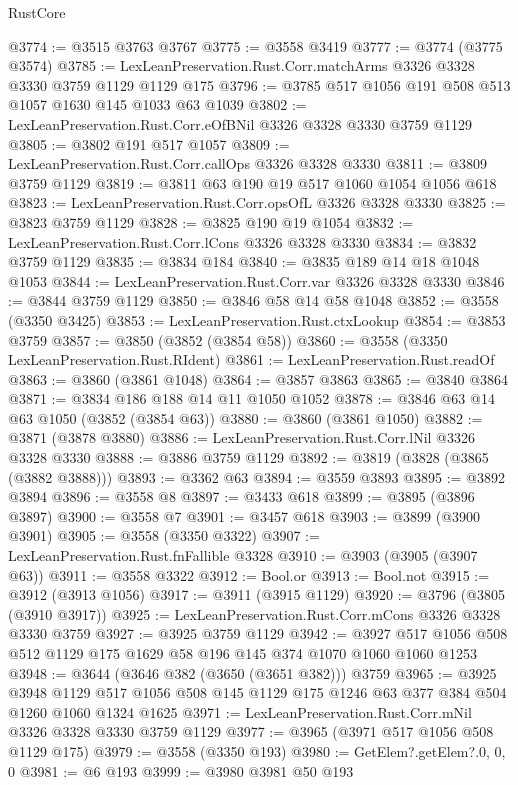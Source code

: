 \begin{lexlean}{RustCore}
\begin{coremodule}
@3774 := @3515 @3763 @3767
@3775 := @3558 @3419
@3777 := @3774 (@3775 @3574)
@3785 := LexLeanPreservation.Rust.Corr.matchArms @3326 @3328 @3330 @3759 @1129 @1129 @175
@3796 := @3785 @517 @1056 @191 @508 @513 @1057 @1630 @145 @1033 @63 @1039
@3802 := LexLeanPreservation.Rust.Corr.eOfBNil @3326 @3328 @3330 @3759 @1129
@3805 := @3802 @191 @517 @1057
@3809 := LexLeanPreservation.Rust.Corr.callOps @3326 @3328 @3330
@3811 := @3809 @3759 @1129
@3819 := @3811 @63 @190 @19 @517 @1060 @1054 @1056 @618
@3823 := LexLeanPreservation.Rust.Corr.opsOfL @3326 @3328 @3330
@3825 := @3823 @3759 @1129
@3828 := @3825 @190 @19 @1054
@3832 := LexLeanPreservation.Rust.Corr.lCons @3326 @3328 @3330
@3834 := @3832 @3759 @1129
@3835 := @3834 @184
@3840 := @3835 @189 @14 @18 @1048 @1053
@3844 := LexLeanPreservation.Rust.Corr.var @3326 @3328 @3330
@3846 := @3844 @3759 @1129
@3850 := @3846 @58 @14 @58 @1048
@3852 := @3558 (@3350 @3425)
@3853 := LexLeanPreservation.Rust.ctxLookup
@3854 := @3853 @3759
@3857 := @3850 (@3852 (@3854 @58))
@3860 := @3558 (@3350 LexLeanPreservation.Rust.RIdent)
@3861 := LexLeanPreservation.Rust.readOf
@3863 := @3860 (@3861 @1048)
@3864 := @3857 @3863
@3865 := @3840 @3864
@3871 := @3834 @186 @188 @14 @11 @1050 @1052
@3878 := @3846 @63 @14 @63 @1050 (@3852 (@3854 @63))
@3880 := @3860 (@3861 @1050)
@3882 := @3871 (@3878 @3880)
@3886 := LexLeanPreservation.Rust.Corr.lNil @3326 @3328 @3330
@3888 := @3886 @3759 @1129
@3892 := @3819 (@3828 (@3865 (@3882 @3888)))
@3893 := @3362 @63
@3894 := @3559 @3893
@3895 := @3892 @3894
@3896 := @3558 @8
@3897 := @3433 @618
@3899 := @3895 (@3896 @3897)
@3900 := @3558 @7
@3901 := @3457 @618
@3903 := @3899 (@3900 @3901)
@3905 := @3558 (@3350 @3322)
@3907 := LexLeanPreservation.Rust.fnFallible @3328
@3910 := @3903 (@3905 (@3907 @63))
@3911 := @3558 @3322
@3912 := Bool.or
@3913 := Bool.not
@3915 := @3912 (@3913 @1056)
@3917 := @3911 (@3915 @1129)
@3920 := @3796 (@3805 (@3910 @3917))
@3925 := LexLeanPreservation.Rust.Corr.mCons @3326 @3328 @3330 @3759
@3927 := @3925 @3759 @1129
@3942 := @3927 @517 @1056 @508 @512 @1129 @175 @1629 @58 @196 @145 @374 @1070 @1060 @1060 @1253
@3948 := @3644 (@3646 @382 (@3650 (@3651 @382))) @3759
@3965 := @3925
    @3948
    @1129
    @517
    @1056
    @508
    @145
    @1129
    @175
    @1246
    @63
    @377
    @384
    @504
    @1260
    @1060
    @1324
    @1625
@3971 := LexLeanPreservation.Rust.Corr.mNil @3326 @3328 @3330 @3759 @1129
@3977 := @3965 (@3971 @517 @1056 @508 @1129 @175)
@3979 := @3558 (@3350 @193)
@3980 := GetElem?.getElem?.{0, 0, 0}
@3981 := @6 @193
@3999 := @3980
    @3981
    @50
    @193

\end{coremodule}
\end{lexlean}
